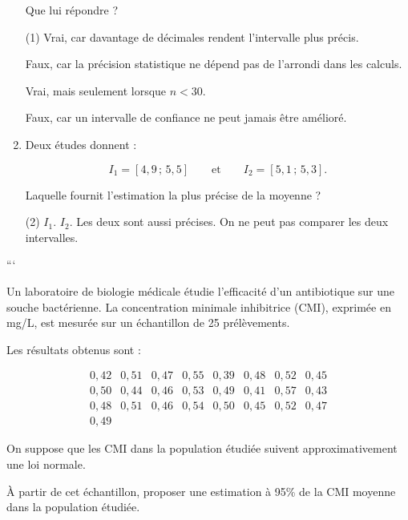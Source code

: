 \documentclass[10pt,a4paper]{article}
\begin{document}
\begin{multicols}{2}
\begin{exo}[QCM][]
\begin{enumerate}[label=\textbf{\arabic*.}, leftmargin=*]
    Que lui répondre ?

    \begin{tasks}(1)
        \task Vrai, car davantage de décimales rendent l'intervalle plus précis.
        
        \task Faux, car la précision statistique ne dépend pas de l'arrondi dans les calculs.
        
        \task Vrai, mais seulement lorsque \(n<30\).
        
        \task Faux, car un intervalle de confiance ne peut jamais être amélioré.
    \end{tasks}

    \item Deux études donnent :

    \[
    I_1=[4,9\,;\,5,5]
    \qquad\text{et}\qquad
    I_2=[5,1\,;\,5,3].
    \]

    Laquelle fournit l'estimation la plus précise de la moyenne ?

    \begin{tasks}(2)
        \task \(I_1\).
        \task \(I_2\).
        \task Les deux sont aussi précises.
        \task On ne peut pas comparer les deux intervalles.
    \end{tasks}

\end{enumerate}
```

\end{exo}

\begin{exo}[][]
Un laboratoire de biologie médicale étudie l'efficacité d'un antibiotique sur une souche bactérienne. La concentration minimale inhibitrice (CMI), exprimée en mg/L, est mesurée sur un échantillon de 25 prélèvements.

Les résultats obtenus sont :

\[
\begin{array}{cccccccc}
0,42&0,51&0,47&0,55&0,39&0,48&0,52&0,45\\
0,50&0,44&0,46&0,53&0,49&0,41&0,57&0,43\\
0,48&0,51&0,46&0,54&0,50&0,45&0,52&0,47 \\
0,49
\end{array}
\]

On suppose que les CMI dans la population étudiée suivent approximativement une loi normale.

À partir de cet échantillon, proposer une estimation à 95\% de la CMI moyenne dans la population étudiée.
\end{exo}



\end{multicols}
\end{document}
